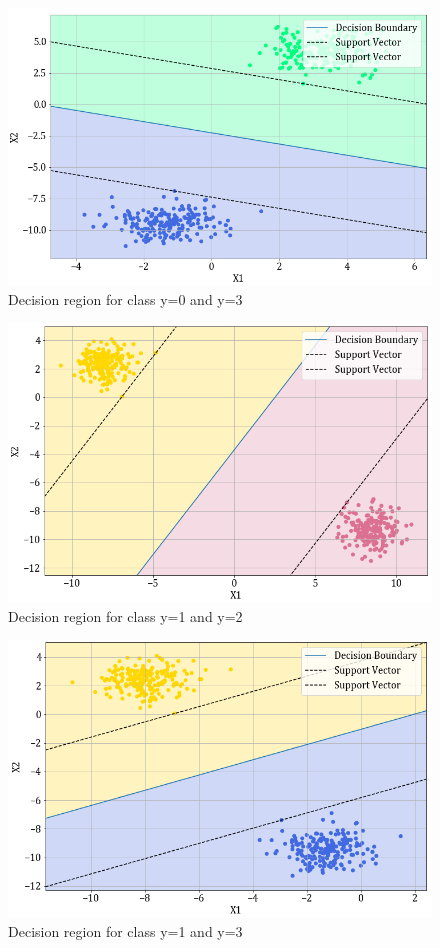 \documentclass[11pt,a4paper]{article}
\begin{document}
\begin{figure}[H]
    \centering
    \includegraphics[scale=0.55]{images/1A_ovo_03.png}
    \caption{Decision region for class y=0 and y=3}
\end{figure}

\begin{figure}[H]
    \centering
    \includegraphics[scale=0.55]{images/1A_ovo_12.png}
    \caption{Decision region for class y=1 and y=2}
\end{figure}

\begin{figure}[H]
    \centering
    \includegraphics[scale=0.55]{images/1A_ovo_13.png}
    \caption{Decision region for class y=1 and y=3}
\end{figure}
\end{document}
